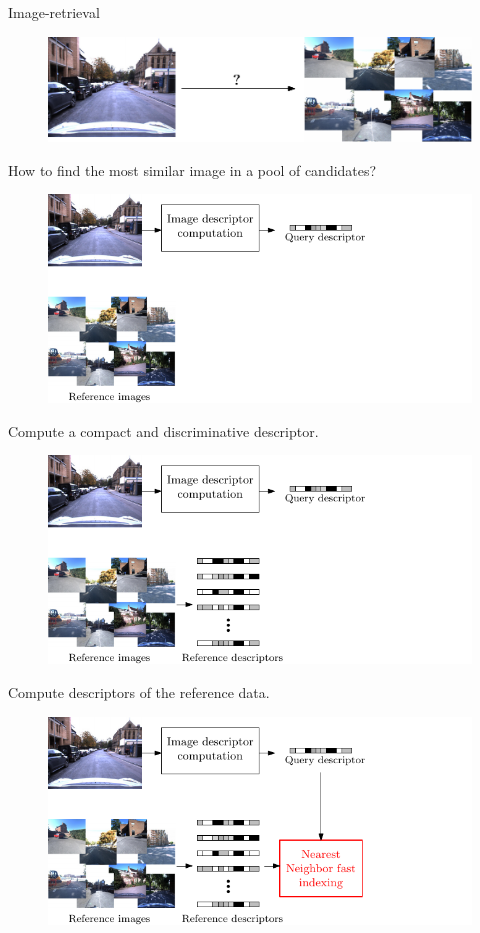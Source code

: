 \begin{frame}{Image-retrieval}
	\only<1>
	{
	\begin{figure}[t]
		\includegraphics[width=0.8\linewidth]{vect/intro/fig3/cbir}
	\end{figure}
	\vfill	
	How to find the most similar image in a pool of candidates?
	}
	{
	\begin{figure}[t]
		\centering
		\includegraphics[width=0.8\linewidth]{vect/intro/fig3/1}
	\end{figure}
	\vfill	
	Compute a compact and discriminative descriptor.
	}
	{
	\begin{figure}[t]
		\centering
		\includegraphics[width=0.8\linewidth]{vect/intro/fig3/2}
	\end{figure}
	\vfill	
	Compute descriptors of the reference data.
	}
	{
	\begin{figure}[t]
		\centering
		\includegraphics[width=0.8\linewidth]{vect/intro/fig3/3}

\end{figure}}
\end{frame}
